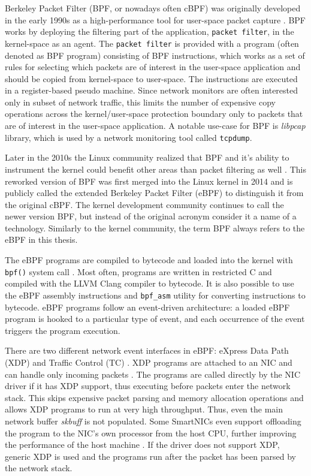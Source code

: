 \documentclass[english, 12pt, a4paper, sci, utf8, a-2b, online]{aaltothesis}
\begin{document}
Berkeley Packet Filter (BPF, or nowadays often cBPF) was originally developed in the early 1990s as a high-performance tool for user-space packet capture \cite{mccanne1993bsd}. BPF works by deploying the filtering part of the application, \texttt{packet filter}, in the kernel-space as an agent. The \texttt{packet filter} is provided with a program (often denoted as BPF program) consisting of BPF instructions, which works as a set of rules for selecting which packets are of interest in the user-space application and should be copied from kernel-space to user-space. The instructions are executed in a register-based pseudo machine. Since network monitors are often interested only in subset of network traffic, this limits the number of expensive copy operations across the kernel/user-space protection boundary only to packets that are of interest in the user-space application. A notable use-case for BPF is \textit{libpcap} library, which is used by a network monitoring tool called \texttt{tcpdump}.

Later in the 2010s the Linux community realized that BPF and it's ability to instrument the kernel could benefit other areas than packet filtering as well \cite{vieira2020fast}. This reworked version of BPF was first merged into the Linux kernel in 2014 and is publicly called the extended Berkeley Packet Filter (eBPF) to distinguish it from the original cBPF. The kernel development community continues to call the newer version BPF, but instead of the original acronym consider it a name of a technology. Similarly to the kernel community, the term BPF always refers to the eBPF in this thesis.

The eBPF programs are compiled to bytecode and loaded into the kernel with \texttt{bpf()} system call \cite{miano2021framework}. Most often, programs are written in restricted C and compiled with the LLVM Clang compiler to bytecode. It is also possible to use the eBPF assembly instructions and \texttt{bpf\_asm} utility for converting instructions to bytecode. eBPF programs follow an event-driven architecture: a loaded eBPF program is hooked to a particular type of event, and each occurrence of the event triggers the program execution.

There are two different network event interfaces in eBPF: eXpress Data Path (XDP) and Traffic Control (TC) \cite{miano2021framework}.
XDP programs are attached to an NIC and can handle only incoming packets \cite{hoiland2018express}. The programs are called directly by the NIC driver if it has XDP support, thus executing before packets enter the network stack. This skips expensive packet parsing and memory allocation operations and allows XDP programs to run at very high throughput. Thus, even the main network buffer \textit{skbuff} is not populated. Some SmartNICs even support offloading the program to the NIC's own processor from the host CPU, further improving the performance of the host machine \cite{cilium-program-types}. If the driver does not support XDP, generic XDP is used and the programs run after the packet has been parsed by the network stack.
\end{document}
